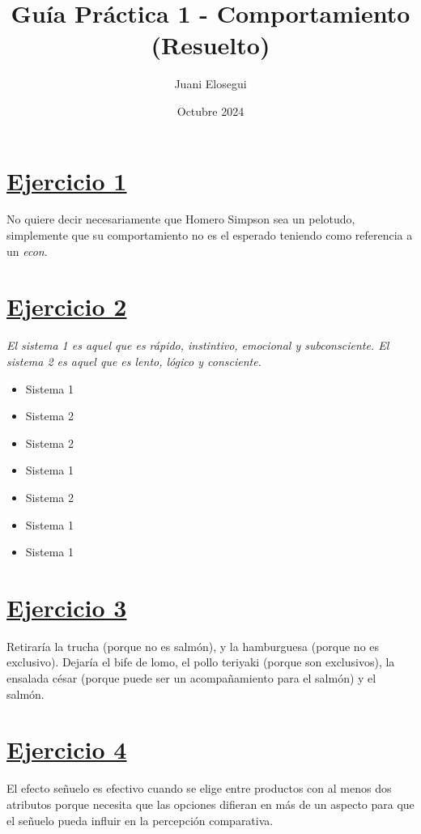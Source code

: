 \documentclass{article}
\title{Guía Práctica 1 - Comportamiento (Resuelto)}
\author{Juani Elosegui}
\date{Octubre 2024}
\begin{document}
    \maketitle

    \section*{\underline{Ejercicio 1}}
        No quiere decir necesariamente que Homero Simpson sea un pelotudo, simplemente que su comportamiento no es el esperado teniendo como referencia a un \textit{econ}.

    \section*{\underline{Ejercicio 2}}
        \textit{El sistema 1 es aquel que es rápido, instintivo, emocional y subconsciente. El sistema 2 es aquel que es lento, lógico y consciente.}

        \begin{itemize}
            \item Sistema 1
            \item Sistema 2
            \item Sistema 2
            \item Sistema 1
            \item Sistema 2
            \item Sistema 1
            \item Sistema 1
        \end{itemize}

    \section*{\underline{Ejercicio 3}}
        Retiraría la trucha (porque no es salmón), y la hamburguesa (porque no es exclusivo). Dejaría el bife de lomo, el pollo teriyaki (porque son exclusivos), la ensalada césar (porque puede ser un acompañamiento para el salmón) y el salmón.

    \section*{\underline{Ejercicio 4}}
        El efecto señuelo es efectivo cuando se elige entre productos con al menos dos atributos porque necesita que las opciones difieran en más de un aspecto para que el señuelo pueda influir en la percepción comparativa.
\end{document}
